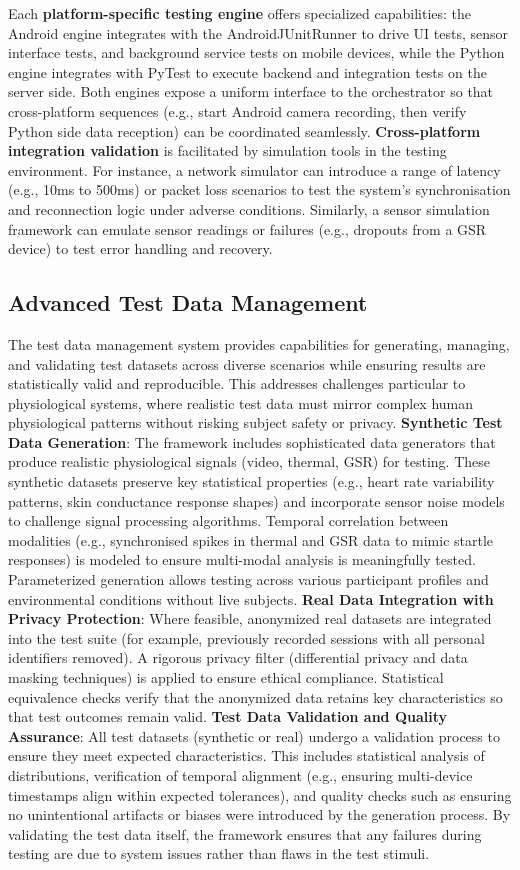 \documentclass[11pt,a4paper]{report}
\begin{document}
Each \textbf{platform-specific testing engine} offers specialized capabilities: the Android engine integrates with the AndroidJUnitRunner to drive UI tests, sensor interface tests, and background service tests on mobile devices, while the Python engine integrates with PyTest to execute backend and integration tests on the server side. Both engines expose a uniform interface to the orchestrator so that cross-platform sequences (e.g., start Android camera recording, then verify Python side data reception) can be coordinated seamlessly.
\textbf{Cross-platform integration validation} is facilitated by simulation tools in the testing environment. For instance, a network simulator can introduce a range of latency (e.g., 10ms to 500ms) or packet loss scenarios to test the system’s synchronisation and reconnection logic under adverse conditions. Similarly, a sensor simulation framework can emulate sensor readings or failures (e.g., dropouts from a GSR device) to test error handling and recovery.
\subsection{Advanced Test Data Management}
The test data management system provides capabilities for generating, managing, and validating test datasets across diverse scenarios while ensuring results are statistically valid and reproducible. This addresses challenges particular to physiological systems, where realistic test data must mirror complex human physiological patterns without risking subject safety or privacy.
\textbf{Synthetic Test Data Generation}: The framework includes sophisticated data generators that produce realistic physiological signals (video, thermal, GSR) for testing. These synthetic datasets preserve key statistical properties (e.g., heart rate variability patterns, skin conductance response shapes) and incorporate sensor noise models to challenge signal processing algorithms. Temporal correlation between modalities (e.g., synchronised spikes in thermal and GSR data to mimic startle responses) is modeled to ensure multi-modal analysis is meaningfully tested. Parameterized generation allows testing across various participant profiles and environmental conditions without live subjects.
\textbf{Real Data Integration with Privacy Protection}: Where feasible, anonymized real datasets are integrated into the test suite (for example, previously recorded sessions with all personal identifiers removed). A rigorous privacy filter (differential privacy and data masking techniques) is applied to ensure ethical compliance. Statistical equivalence checks verify that the anonymized data retains key characteristics so that test outcomes remain valid.
\textbf{Test Data Validation and Quality Assurance}: All test datasets (synthetic or real) undergo a validation process to ensure they meet expected characteristics. This includes statistical analysis of distributions, verification of temporal alignment (e.g., ensuring multi-device timestamps align within expected tolerances), and quality checks such as ensuring no unintentional artifacts or biases were introduced by the generation process. By validating the test data itself, the framework ensures that any failures during testing are due to system issues rather than flaws in the test stimuli.
\end{document}
